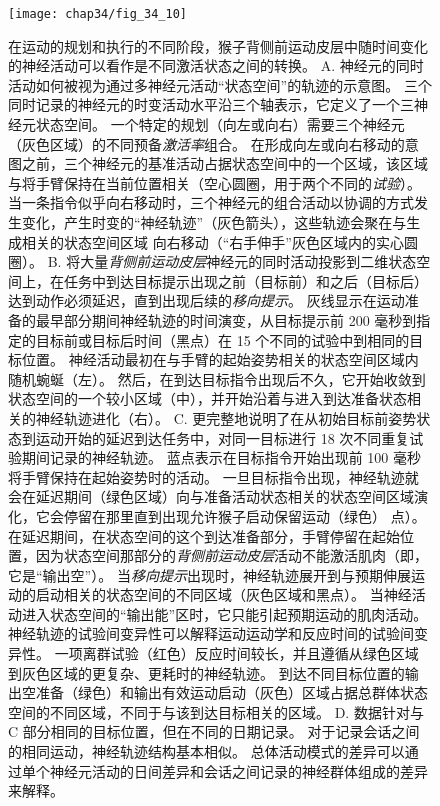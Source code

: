 \begin{figure}[htbp]
	\centering
	\texttt{[image: chap34/fig\_34\_10]}
	\caption{在运动的规划和执行的不同阶段，猴子背侧前运动皮层中随时间变化的神经活动可以看作是不同激活状态之间的转换。
		A. 神经元的同时活动如何被视为通过多神经元活动“状态空间”的轨迹的示意图。
		三个同时记录的神经元的时变活动水平沿三个轴表示，它定义了一个三神经元状态空间。
		一个特定的规划（向左或向右）需要三个神经元（灰色区域）的不同预备\textit{激活率}组合。
		在形成向左或向右移动的意图之前，三个神经元的基准活动占据状态空间中的一个区域，该区域与将手臂保持在当前位置相关（空心圆圈，用于两个不同的\textit{试验}）。
		当一条指令似乎向右移动时，三个神经元的组合活动以协调的方式发生变化，产生时变的“神经轨迹”（灰色箭头），这些轨迹会聚在与生成相关的状态空间区域 向右移动（“右手伸手”灰色区域内的实心圆圈）。
		B. 将大量\textit{背侧前运动皮层}神经元的同时活动投影到二维状态空间上，在任务中到达目标提示出现之前（目标前）和之后（目标后） 达到动作必须延迟，直到出现后续的\textit{移向提示}。
		灰线显示在运动准备的最早部分期间神经轨迹的时间演变，从目标提示前 200 毫秒到指定的目标前或目标后时间（黑点）在 15 个不同的试验中到相同的目标位置。
		神经活动最初在与手臂的起始姿势相关的状态空间区域内随机蜿蜒（左）。
		然后，在到达目标指令出现后不久，它开始收敛到状态空间的一个较小区域（中），并开始沿着与进入到达准备状态相关的神经轨迹进化（右）。
		C. 更完整地说明了在从初始目标前姿势状态到运动开始的延迟到达任务中，对同一目标进行 18 次不同重复试验期间记录的神经轨迹。
		蓝点表示在目标指令开始出现前 100 毫秒将手臂保持在起始姿势时的活动。
		一旦目标指令出现，神经轨迹就会在延迟期间（绿色区域）向与准备活动状态相关的状态空间区域演化，它会停留在那里直到出现允许猴子启动保留运动（绿色） 点）。
		在延迟期间，在状态空间的这个到达准备部分，手臂停留在起始位置，因为状态空间那部分的\textit{背侧前运动皮层}活动不能激活肌肉（即，它是“输出空”）。
		当\textit{移向提示}出现时，神经轨迹展开到与预期伸展运动的启动相关的状态空间的不同区域（灰色区域和黑点）。
		当神经活动进入状态空间的“输出能”区时，它只能引起预期运动的肌肉活动。
		神经轨迹的试验间变异性可以解释运动运动学和反应时间的试验间变异性。
		一项离群试验（红色）反应时间较长，并且遵循从绿色区域到灰色区域的更复杂、更耗时的神经轨迹。
		到达不同目标位置的输出空准备（绿色）和输出有效运动启动（灰色）区域占据总群体状态空间的不同区域，不同于与该到达目标相关的区域。
		D. 数据针对与 C 部分相同的目标位置，但在不同的日期记录。
		对于记录会话之间的相同运动，神经轨迹结构基本相似。
		总体活动模式的差异可以通过单个神经元活动的日间差异和会话之间记录的神经群体组成的差异来解释。}
	\label{fig:34_10}
\end{figure}



